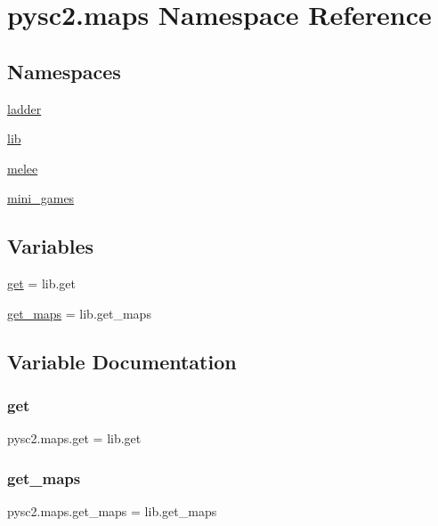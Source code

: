 \hypertarget{namespacepysc2_1_1maps}{}\section{pysc2.\+maps Namespace Reference}
\label{namespacepysc2_1_1maps}
\subsection*{Namespaces}
\begin{DoxyCompactItemize}
\item 
 \mbox{\hyperlink{namespacepysc2_1_1maps_1_1ladder}{ladder}}
\item 
 \mbox{\hyperlink{namespacepysc2_1_1maps_1_1lib}{lib}}
\item 
 \mbox{\hyperlink{namespacepysc2_1_1maps_1_1melee}{melee}}
\item 
 \mbox{\hyperlink{namespacepysc2_1_1maps_1_1mini__games}{mini\+\_\+games}}
\end{DoxyCompactItemize}
\subsection*{Variables}
\begin{DoxyCompactItemize}
\item 
\mbox{\hyperlink{namespacepysc2_1_1maps_a7339e6c1eb478b31383819b34c166f9d}{get}} = lib.\+get
\item 
\mbox{\hyperlink{namespacepysc2_1_1maps_a83ad28e5166305a4ae6b833cd8fbc312}{get\+\_\+maps}} = lib.\+get\+\_\+maps
\end{DoxyCompactItemize}


\subsection{Variable Documentation}
\mbox{\label{namespacepysc2_1_1maps_a7339e6c1eb478b31383819b34c166f9d}} 
\subsubsection{\texorpdfstring{get}{get}}
{\footnotesize\ttfamily pysc2.\+maps.\+get = lib.\+get}

\mbox{\label{namespacepysc2_1_1maps_a83ad28e5166305a4ae6b833cd8fbc312}} 
\subsubsection{\texorpdfstring{get\+\_\+maps}{get\_maps}}
{\footnotesize\ttfamily pysc2.\+maps.\+get\+\_\+maps = lib.\+get\+\_\+maps}

